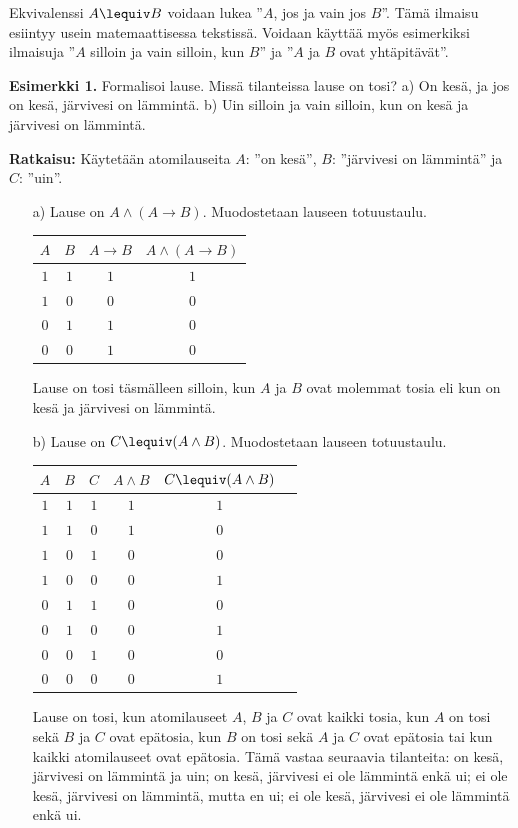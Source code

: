 \bigskip

Ekvivalenssi $A\lequiv B$ voidaan lukea ''$A$, jos ja vain jos $B$''. Tämä ilmaisu esiintyy usein matemaattisessa tekstissä. Voidaan käyttää myös esimerkiksi ilmaisuja ''$A$ silloin ja vain silloin, kun $B$'' ja ''$A$ ja $B$ ovat yhtäpitävät''.

{\bf Esimerkki 1.} Formalisoi lause. Missä tilanteissa lause on tosi? a) On kesä, ja jos on kesä, järvivesi on lämmintä. b) Uin silloin ja vain silloin, kun on kesä ja järvivesi on lämmintä. 

{\bf Ratkaisu:}
Käytetään atomilauseita $A$: ''on kesä'',
$B$: ''järvivesi on lämmintä'' ja $C$: ''uin''.
\begin{itemize}
\item[a)] Lause on $A \land (A \to B)$. Muodostetaan
lauseen totuustaulu.

\begin{center}
\begin{tabular}{|c|c|c|c|}\hline
$A$ & $B$ & $A \to B$ & $A \land (A \to B)$\\ \hline
$1$ & $1$ & $1$ & $1$\\ %
$1$ & $0$ & $0$ & $0$\\
$0$ & $1$ & $1$ & $0$\\
$0$ & $0$ & $1$ & $0$\\ \hline
\end{tabular}
\end{center}

Lause on tosi täsmälleen silloin, kun $A$ ja $B$ ovat
molemmat tosia eli kun on kesä ja järvivesi on lämmintä.
\item[b)] Lause on $C \lequiv (A \land B)$. Muodostetaan
lauseen totuustaulu.

\begin{center}
\begin{tabular}{|c|c|c|c|c|c|}\hline
$A$ & $B$ & $C$ & $A \land B$ & $C \lequiv (A \land B)$\\
\hline
$1$ & $1$ & $1$ & $1$ & $1$\\ %
$1$ & $1$ & $0$ & $1$ & $0$\\
$1$ & $0$ & $1$ & $0$ & $0$\\ %
$1$ & $0$ & $0$ & $0$ & $1$\\
$0$ & $1$ & $1$ & $0$ & $0$\\
$0$ & $1$ & $0$ & $0$ & $1$\\ %
$0$ & $0$ & $1$ & $0$ & $0$\\
$0$ & $0$ & $0$ & $0$ & $1$\\ \hline
\end{tabular}
\end{center}

Lause on tosi, kun atomilauseet $A$, $B$ ja $C$ ovat
kaikki tosia, kun $A$ on tosi sekä $B$ ja $C$ ovat
epätosia, kun $B$ on tosi sekä $A$ ja $C$ ovat epätosia
tai kun kaikki atomilauseet ovat epätosia. Tämä vastaa
seuraavia tilanteita: on kesä, järvivesi on lämmintä ja
uin; on kesä, järvivesi ei ole lämmintä enkä ui; ei ole
kesä, järvivesi on lämmintä, mutta en ui; ei ole kesä,
järvivesi ei ole lämmintä enkä ui.
\end{itemize}

